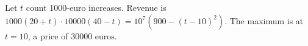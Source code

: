 Let $t$ count 1000-euro increases. Revenue is $1000(20+t)\cdot10000(40-t)=10^7(900-(t-10)^2)$. The maximum is at $t=10$, a price of $\boxed{30000\text{ euros}}$.
